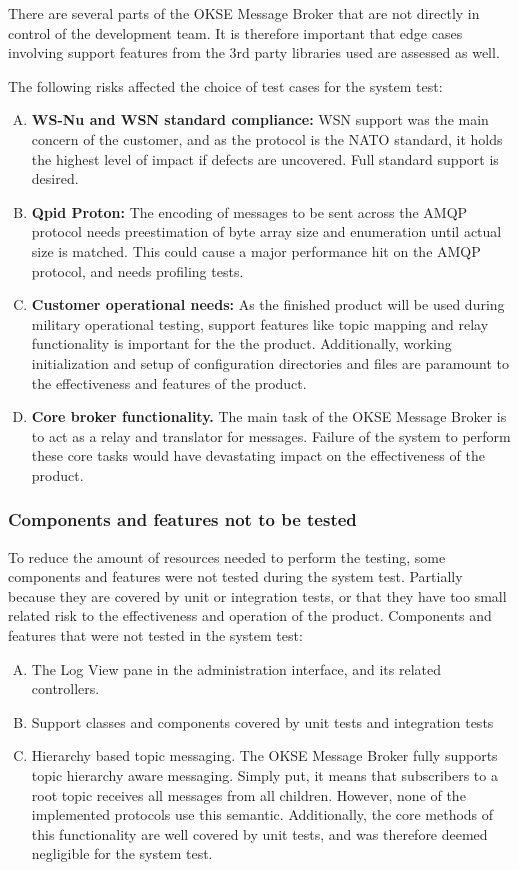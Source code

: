There are several parts of the OKSE Message Broker that are not directly in control of the development team. It is therefore important that edge cases involving support features from the 3rd party libraries used are assessed as well.

The following risks affected the choice of test cases for the system test:

\begin{enumerate}[A.]
\item \textbf{WS-Nu and WSN standard compliance:} WSN support was the main concern of the customer, and as the protocol is the NATO standard, it holds the highest level of impact if defects are uncovered. Full standard support is desired.
\item \textbf{Qpid Proton:} The encoding of messages to be sent across the AMQP protocol needs preestimation of byte array size and enumeration until actual size is matched. This could cause a major performance hit on the AMQP protocol, and needs profiling tests.
\item \textbf{Customer operational needs:} As the finished product will be used during military operational testing, support features like topic mapping and relay functionality is important for the the product. Additionally, working initialization and setup of configuration directories and files are paramount to the effectiveness and features of the product.
\item \textbf{Core broker functionality.} The main task of the OKSE Message Broker is to act as a relay and translator for messages. Failure of the system to perform these core tasks would have devastating impact on the effectiveness of the product.
\end{enumerate}

\subsubsection{Components and features not to be tested}

To reduce the amount of resources needed to perform the testing, some components and features were not tested during the system test. Partially because they are covered by unit or integration tests, or that they have too small related risk to the effectiveness and operation of the product.
Components and features that were not tested in the system test:

\begin{enumerate}[A.]
\item The Log View pane in the administration interface, and its related controllers.
\item Support classes and components covered by unit tests and integration tests
\item Hierarchy based topic messaging. The OKSE Message Broker fully supports topic hierarchy aware messaging. Simply put, it means that subscribers to a root topic receives all messages from all children. However, none of the implemented protocols use this semantic. Additionally, the core methods of this functionality are well covered by unit tests, and was therefore deemed negligible for the system test.
\end{enumerate}


